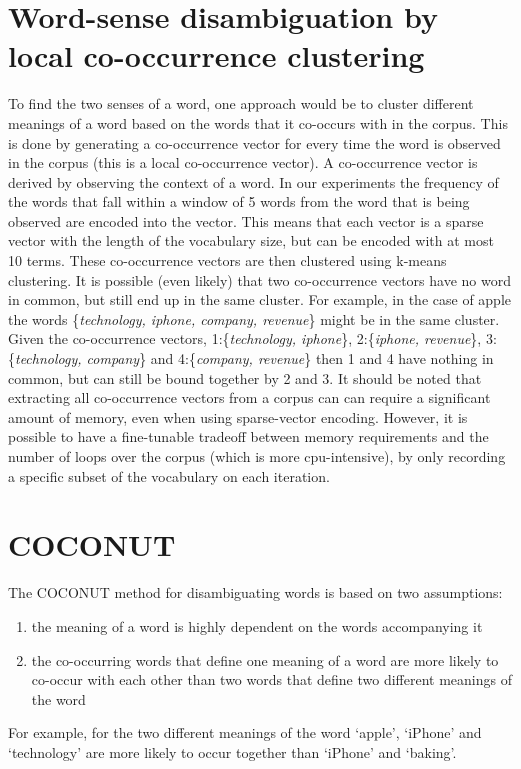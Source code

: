 \documentclass[11pt]{article}
\begin{document}
\section{Word-sense disambiguation by local co-occurrence clustering}
\label{remi}
To find the two senses of a word, one approach would be to cluster different meanings of a word based on the words that it co-occurs with in the corpus. This is done by generating a co-occurrence vector for every time the word is observed in the corpus (this is a local co-occurrence vector). A co-occurrence vector is derived by observing the context of a word. In our experiments the frequency of the words that fall within a window of 5 words from the word that is being observed are encoded into the vector. This means that each vector is a sparse vector with the length of the vocabulary size, but can be encoded with at most 10 terms. These co-occurrence vectors are then clustered using k-means clustering. It is possible (even likely) that two co-occurrence vectors have no word in common, but still end up in the same cluster. For example, in the case of apple the words \{\textit{technology, iphone, company, revenue}\} might be in the same cluster. Given the co-occurrence vectors, 1:\{\textit{technology, iphone}\}, 2:\{\textit{iphone, revenue}\}, 3:\{\textit{technology, company}\} and 4:\{\textit{company, revenue}\} then 1 and 4 have nothing in common, but can still be bound together by 2 and 3. It should be noted that extracting all co-occurrence vectors from a corpus can can require a significant amount of memory, even when using sparse-vector encoding. However, it is possible to have a fine-tunable tradeoff between memory requirements and the number of loops over the corpus (which is more cpu-intensive), by only recording a specific subset of the vocabulary on each iteration.

\section{COCONUT}
\label{anouk}
The COCONUT method for disambiguating words is based on two assumptions: 
\begin{enumerate}
\item the meaning of a word is highly dependent on the words accompanying it
\item the co-occurring words that define one meaning of a word are more likely to co-occur with each other than two words that define two different meanings of the word
\end{enumerate}
For example, for the two different meanings of the word `apple', `iPhone' and `technology' are more likely to occur together than `iPhone' and `baking'. 
\end{document}

